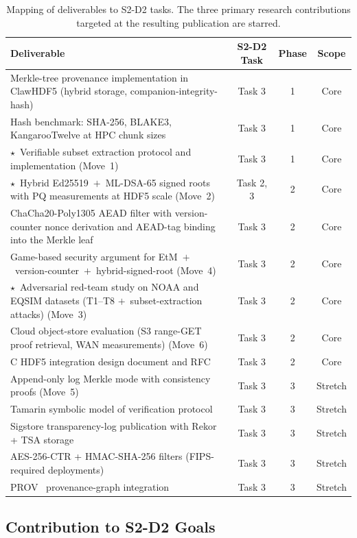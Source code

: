 \documentclass[11pt]{article}
\begin{document}
\begin{table}[H]
\centering
\caption{Mapping of deliverables to S2-D2 tasks. The three primary research
contributions targeted at the resulting publication are starred.}
\label{tab:deliverables}
\begin{tabular}{@{}p{7.0cm}ccc@{}}
\toprule
Deliverable & S2-D2 Task & Phase & Scope \\
\midrule
Merkle-tree provenance implementation in ClawHDF5 (hybrid storage,
  companion-integrity-hash)
  & Task 3 & 1 & Core \\
Hash benchmark: SHA-256, BLAKE3, KangarooTwelve at HPC chunk sizes
  & Task 3 & 1 & Core \\
$\star$~Verifiable subset extraction protocol and implementation (Move~1)
  & Task 3 & 1 & Core \\
$\star$~Hybrid Ed25519~$+$~ML-DSA-65 signed roots with PQ measurements
  at HDF5 scale (Move~2)
  & Task 2, 3 & 2 & Core \\
ChaCha20-Poly1305 AEAD filter with version-counter nonce derivation and
  AEAD-tag binding into the Merkle leaf
  & Task 3 & 2 & Core \\
Game-based security argument for EtM~$+$~version-counter~$+$~hybrid-signed-root
  (Move~4)
  & Task 3 & 2 & Core \\
$\star$~Adversarial red-team study on NOAA and EQSIM datasets (T1--T8
  $+$~subset-extraction attacks) (Move~3)
  & Task 3 & 2 & Core \\
Cloud object-store evaluation (S3 range-GET proof retrieval, WAN
  measurements) (Move~6)
  & Task 3 & 2 & Core \\
C HDF5 integration design document and RFC
  & Task 3 & 2 & Core \\
Append-only log Merkle mode with consistency proofs (Move~5)
  & Task 3 & 3 & Stretch \\
Tamarin symbolic model of verification protocol
  & Task 3 & 3 & Stretch \\
Sigstore transparency-log publication with Rekor + TSA storage
  & Task 3 & 3 & Stretch \\
AES-256-CTR + HMAC-SHA-256 filters (FIPS-required deployments)
  & Task 3 & 3 & Stretch \\
PROV~\cite{w3cprov} provenance-graph integration
  & Task 3 & 3 & Stretch \\
\bottomrule
\end{tabular}
\end{table}

\subsection{Contribution to S2-D2 Goals}
\end{document}
